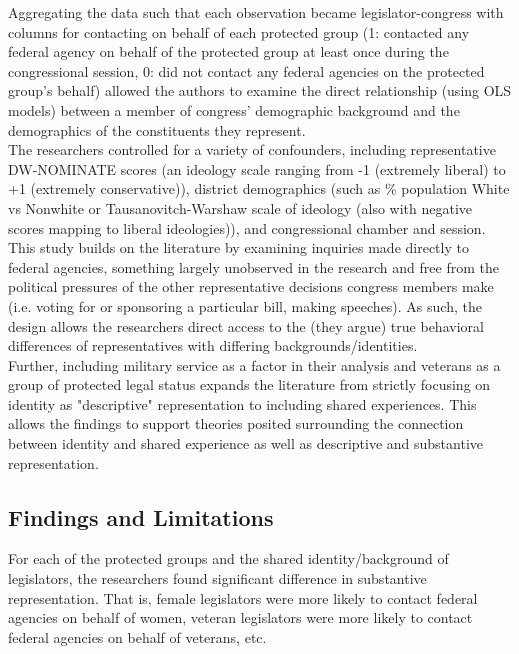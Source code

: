\documentclass[12pt,letterpaper]{article}
\begin{document}
	Aggregating the data such that each observation became legislator-congress with columns for contacting on behalf of each protected group (1: contacted any federal agency on behalf of the protected group at least once during the congressional session, 0: did not contact any federal agencies on the protected group's behalf) allowed the authors to examine the direct relationship (using OLS models) between a member of congress' demographic background and the demographics of the constituents they represent.\\
	
	The researchers controlled for a variety of confounders, including representative DW-NOMINATE scores (an ideology scale ranging from -1 (extremely liberal) to +1 (extremely conservative)), district demographics (such as \% population White vs Nonwhite or Tausanovitch-Warshaw scale of ideology (also with negative scores mapping to liberal ideologies)), and congressional chamber and session.\\
	
	This study builds on the literature by examining inquiries made directly to federal agencies, something largely unobserved in the research and free from the political pressures of the other representative decisions congress members make (i.e. voting for or sponsoring a particular bill, making speeches). As such, the design allows the researchers direct access to the (they argue) true behavioral differences of representatives with differing backgrounds/identities.\\
	
	Further, including military service as a factor in their analysis and veterans as a group of protected legal status expands the literature from strictly focusing on identity as "descriptive" representation to including shared experiences. This allows the findings to support theories posited surrounding the connection between identity and shared experience as well as descriptive and substantive representation.\\
	
	\subsection*{Findings and Limitations}
	
	For each of the protected groups and the shared identity/background of legislators, the researchers found significant difference in substantive representation. That is, female legislators were more likely to contact federal agencies on behalf of women, veteran legislators were more likely to contact federal agencies on behalf of veterans, etc. \\
	
\end{document}

